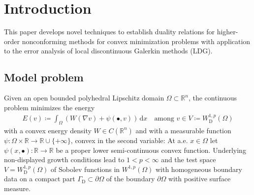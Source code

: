 \documentclass[a4paper]{amsart}
\numberwithin{equation}{section}
\newcommand{\R}{\mathbb{R}}
\renewcommand{\d}[1]{\,\mathrm{d}#1}
\theoremstyle{remark}
\begin{document}
\maketitle

\section{Introduction}\label{sec:main-results}
This paper develops novel techniques to establish duality relations for higher-order nonconforming methods for convex minimization problems with application to the error analysis of local discontinuous Galerkin methods (LDG).

\subsection{Model problem}\label{sec:continuous-problem}
Given an open bounded polyhedral Lipschitz domain $\Omega \subset \mathbb{R}^n$, the continuous problem minimizes the energy
\begin{align}
	E(v) \coloneqq \int_\Omega (W(\nabla v) + \psi(\bullet,v)) \d{x} \quad\text{among } v \in V \coloneqq W^{1,p}_\mathrm{D}(\Omega)\label{def:energy}
\end{align}
with  a convex energy density $W \in C(\mathbb{R}^n)$ and with 
a measurable function $\psi : \Omega \times \mathbb{R} \to \mathbb{R} \cup \{+\infty\}$,  convex
in the second variable: At a.e. $x \in \Omega$ let 
$\psi(x, \bullet):\R\to\R $ be a  proper lower semi-continuous convex function. 
Underlying non-displayed growth conditions lead to 
$1<p<\infty$  and the test space 
$V = W^{1,p}_\mathrm{D}(\Omega)$ of Sobolev functions in $W^{1,p}(\Omega)$ with homogeneous boundary data on a compact part $\Gamma_\mathrm{D} \subset \partial \Omega$ of the boundary $\partial \Omega$ with 
positive surface measure. 
\end{document}
